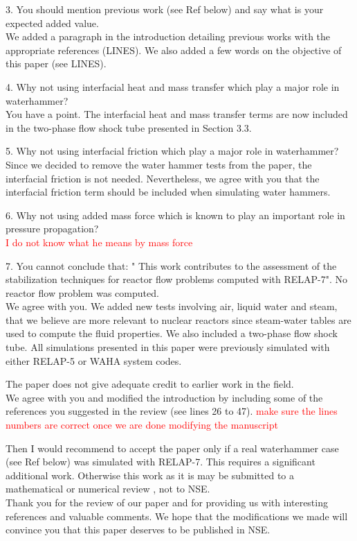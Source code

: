 \documentclass{article}
\newcommand{\tcr}[1]{\textcolor{red}{#1}}
\begin{document}
{\color{blue}
3. You should mention previous work (see Ref below) and say what is your expected added value. \\
}
We added a paragraph in the introduction detailing previous works with the appropriate references (LINES). We also added a few words on the objective of this paper (see LINES).

\bigskip

{\color{blue}
4. Why not using interfacial heat and mass transfer which play a major role in waterhammer? \\
}
You have a point. The interfacial heat and mass transfer terms are now included in the two-phase flow shock tube presented in Section 3.3.
\bigskip

{\color{blue}
5. Why not using interfacial friction which play a major role in waterhammer? \\
}
Since we decided to remove the water hammer tests from the paper, the interfacial friction is not needed. Nevertheless, we agree with you that the interfacial friction term should be included when simulating water hammers.
\bigskip

{\color{blue}
6. Why not using added mass force which is known to play an important role in pressure propagation? \\
}
\tcr{I do not know what he means by mass force}
\bigskip

{\color{blue}
7. You cannot conclude that: " This work contributes to the assessment of the stabilization techniques for reactor flow problems computed with RELAP-7". No reactor flow problem was computed. \\
}
We agree with you. We added new tests involving air, liquid water and steam, that we believe are more relevant to nuclear reactors since steam-water tables are used to compute the fluid properties. We also included a two-phase flow shock tube. All simulations presented in this paper were previously simulated with either RELAP-5 or WAHA system codes. 
\bigskip

{\color{blue}
The paper does not give adequate credit to earlier work in the field. \\
}
We agree with you and modified the introduction by including some of the references you suggested in the review (see lines 26 to 47).
\tcr{make sure the lines numbers are correct once we are done modifying the manuscript}

\bigskip

{\color{blue}
Then I would recommend to accept the paper only if a real waterhammer case (see Ref below) was simulated with RELAP-7. This requires a significant additional work.
Otherwise this work as it is may be submitted to a mathematical or numerical review , not to NSE. \\
}
Thank you for the review of our paper and for providing us with interesting references and valuable comments. We hope that the modifications we made will convince you that this paper deserves to be published in NSE.
\end{document}
